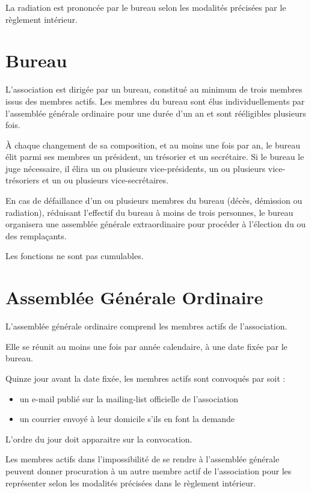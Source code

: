 \documentclass[a4paper, 11pt]{article}
\begin{document}
La radiation est prononcée par le bureau selon les modalités précisées par le règlement intérieur.


\section{Bureau} %

L'association est dirigée par un bureau, constitué au minimum de trois membres issus des membres actifs.
Les membres du bureau sont élus individuellements par l'assemblée générale ordinaire pour une durée d'un an et sont
rééligibles plusieurs fois.

À chaque changement de sa composition, et au moins une fois par an, le bureau élit parmi ses membres un président, un
trésorier et un secrétaire.
Si le bureau le juge nécessaire, il élira un ou plusieurs vice-présidents, un ou plusieurs vice-trésoriers et un ou
plusieurs vice-secrétaires.


En cas de défaillance d'un ou plusieurs membres du bureau (décès, démission ou radiation), réduisant l'effectif du
bureau à moins de trois personnes, le bureau organisera une assemblée générale extraordinaire pour procéder à l'élection
du ou des remplaçants.

Les fonctions ne sont pas cumulables.


\section{Assemblée Générale Ordinaire} %

L'assemblée générale ordinaire comprend les membres actifs de l'association.

Elle se réunit au moins une fois par année calendaire, à une date fixée par le bureau.

Quinze jour avant la date fixée, les membres actifs sont convoqués par soit :

\begin{itemize}
    \item un e-mail publié sur la mailing-list officielle de l'association
    \item un courrier envoyé à leur domicile s'ils en font la demande
\end{itemize}

L'ordre du jour doit apparaitre sur la convocation.

Les membres actifs dans l'impossibilité de se rendre à l'assemblée générale peuvent donner procuration à un autre membre
actif de l'association pour les représenter selon les modalités précisées dans le règlement intérieur.
\end{document}
